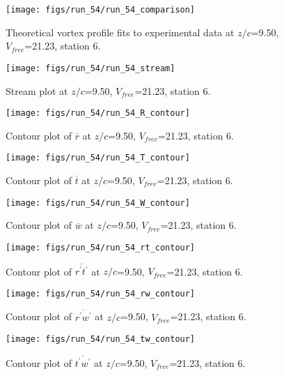 \begin{figure}[H]
\centering
\texttt{[image: figs/run\_54/run\_54\_comparison]}
\caption{Theoretical vortex profile fits to experimental data at $z/c$=9.50, $V_{free}$=21.23, station 6.}
\label{fig:run_54_comparison}
\end{figure}


\begin{figure}[H]
\centering
\texttt{[image: figs/run\_54/run\_54\_stream]}
\caption{Stream plot at $z/c$=9.50, $V_{free}$=21.23, station 6.}
\label{fig:run_54_stream}
\end{figure}


\begin{figure}[H]
\centering
\texttt{[image: figs/run\_54/run\_54\_R\_contour]}
\caption{Contour plot of $\overline{r}$ at $z/c$=9.50, $V_{free}$=21.23, station 6.}
\label{fig:run_54_R_contour}
\end{figure}


\begin{figure}[H]
\centering
\texttt{[image: figs/run\_54/run\_54\_T\_contour]}
\caption{Contour plot of $\overline{t}$ at $z/c$=9.50, $V_{free}$=21.23, station 6.}
\label{fig:run_54_T_contour}
\end{figure}


\begin{figure}[H]
\centering
\texttt{[image: figs/run\_54/run\_54\_W\_contour]}
\caption{Contour plot of $\overline{w}$ at $z/c$=9.50, $V_{free}$=21.23, station 6.}
\label{fig:run_54_W_contour}
\end{figure}


\begin{figure}[H]
\centering
\texttt{[image: figs/run\_54/run\_54\_rt\_contour]}
\caption{Contour plot of $\overline{r^\prime t^\prime}$ at $z/c$=9.50, $V_{free}$=21.23, station 6.}
\label{fig:run_54_rt_contour}
\end{figure}


\begin{figure}[H]
\centering
\texttt{[image: figs/run\_54/run\_54\_rw\_contour]}
\caption{Contour plot of $\overline{r^\prime w^\prime}$ at $z/c$=9.50, $V_{free}$=21.23, station 6.}
\label{fig:run_54_rw_contour}
\end{figure}


\begin{figure}[H]
\centering
\texttt{[image: figs/run\_54/run\_54\_tw\_contour]}
\caption{Contour plot of $\overline{t^\prime w^\prime}$ at $z/c$=9.50, $V_{free}$=21.23, station 6.}
\label{fig:run_54_tw_contour}
\end{figure}


